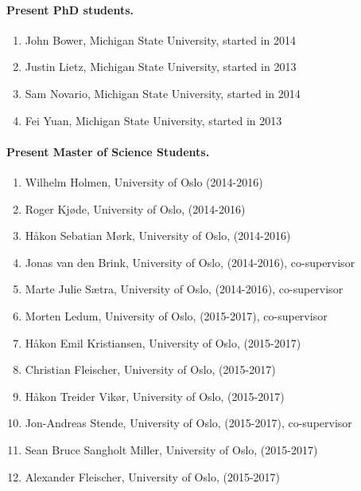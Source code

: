 \documentclass[%
oneside,                 %
final,                   %
10pt]{article}
\begin{document}
\noindent
\paragraph{Present PhD students.}
\begin{enumerate}
\item John Bower, Michigan State University, started in 2014

\item Justin Lietz, Michigan State University, started in 2013

\item Sam Novario, Michigan State University, started in 2014

\item Fei Yuan, Michigan State University, started in 2013
\end{enumerate}

\noindent
\paragraph{Present Master of Science Students.}
\begin{enumerate}
\item Wilhelm Holmen, University of Oslo (2014-2016)

\item Roger Kjøde, University of Oslo, (2014-2016)

\item Håkon Sebatian Mørk, University of Oslo, (2014-2016)

\item Jonas van den Brink, University of Oslo, (2014-2016), co-supervisor

\item Marte Julie Sætra, University of Oslo, (2014-2016), co-supervisor

\item Morten Ledum, University of Oslo, (2015-2017), co-supervisor

\item Håkon Emil Kristiansen, University of Oslo, (2015-2017)

\item Christian Fleischer, University of Oslo, (2015-2017)

\item Håkon Treider Vikør, University of Oslo, (2015-2017)

\item Jon-Andreas Stende, University of Oslo, (2015-2017), co-supervisor

\item Sean Bruce Sangholt Miller, University of Oslo, (2015-2017)

\item Alexander Fleischer, University of Oslo, (2015-2017)
\end{enumerate}
\end{document}
